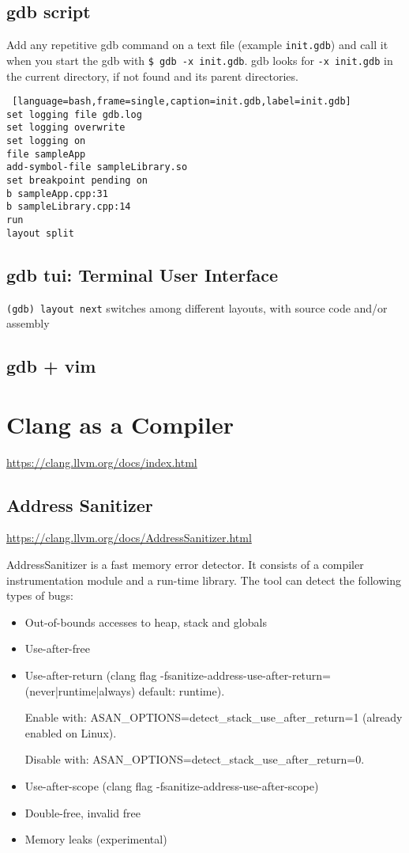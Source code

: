\subsection{gdb script}

Add any repetitive gdb command on a text file (example \texttt{init.gdb}) and call it when you start the gdb with \texttt{\$ gdb -x init.gdb}.
gdb looks for \texttt{-x init.gdb} in the current directory, if not found and its parent directories.

\begin{lstlisting} [language=bash,frame=single,caption=init.gdb,label=init.gdb]
set logging file gdb.log
set logging overwrite
set logging on
file sampleApp
add-symbol-file sampleLibrary.so
set breakpoint pending on
b sampleApp.cpp:31
b sampleLibrary.cpp:14
run
layout split
\end{lstlisting}

\subsection{gdb tui: Terminal User Interface}
\texttt{(gdb) layout next} switches among different layouts, with source code and/or assembly


\subsection{gdb + vim}

\section{Clang as a Compiler}%
\label{sec:clang_as_a_compiler}
\href{Clang as a Compiler}{https://clang.llvm.org/docs/index.html} 

\subsection{Address Sanitizer}%
\label{sec:address_sanitizer}
\href{Address Sanitizer}{https://clang.llvm.org/docs/AddressSanitizer.html} 

AddressSanitizer is a fast memory error detector. It consists of a compiler instrumentation module and a run-time library. The tool can detect the following types of bugs:

\begin{itemize}
  \item Out-of-bounds accesses to heap, stack and globals
  \item Use-after-free
  \item Use-after-return (clang flag -fsanitize-address-use-after-return=(never|runtime|always) default: runtime).


    Enable with: ASAN\_OPTIONS=detect\_stack\_use\_after\_return=1 (already enabled on Linux).


    Disable with: ASAN\_OPTIONS=detect\_stack\_use\_after\_return=0.
  \item Use-after-scope (clang flag -fsanitize-address-use-after-scope)
  \item Double-free, invalid free
  \item Memory leaks (experimental)
\end{itemize}

